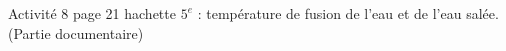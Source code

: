 \begin{myact}{}
	Activité 8 page 21 hachette $5^e$ : température de fusion de l'eau et de l'eau salée.
	(Partie documentaire)
\end{myact}